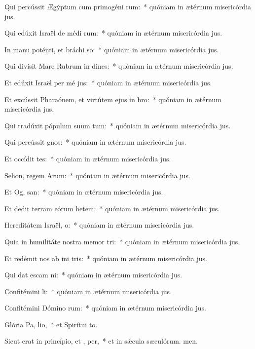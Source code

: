 \item Qui percússit Ægýptum cum primogéni rum:~* quóniam in ætérnum misericórdia jus.
\item Qui edúxit Israël de médi rum:~* quóniam in ætérnum misericórdia jus.
\item In manu poténti, et bráchi so:~* quóniam in ætérnum misericórdia jus.
\item Qui divísit Mare Rubrum in dines:~* quóniam in ætérnum misericórdia jus.
\item Et edúxit Israël per mé jus:~* quóniam in ætérnum misericórdia jus.
\item Et excússit Pharaónem, et virtútem ejus in  bro:~* quóniam in ætérnum misericórdia jus.
\item Qui tradúxit pópulum suum  tum:~* quóniam in ætérnum misericórdia jus.
\item Qui percússit  gnos:~* quóniam in ætérnum misericórdia jus.
\item Et occídit  tes:~* quóniam in ætérnum misericórdia jus.
\item Sehon, regem Arum:~* quóniam in ætérnum misericórdia jus.
\item Et Og,  san:~* quóniam in ætérnum misericórdia jus.
\item Et dedit terram eórum hetem:~* quóniam in ætérnum misericórdia jus.
\item Hereditátem Israël,  o:~* quóniam in ætérnum misericórdia jus.
\item Quia in humilitáte nostra memor  tri:~* quóniam in ætérnum misericórdia jus.
\item Et redémit nos ab ini tris:~* quóniam in ætérnum misericórdia jus.
\item Qui dat escam  ni:~* quóniam in ætérnum misericórdia jus.
\item Confitémini  li:~* quóniam in ætérnum misericórdia jus.
\item Confitémini Dómino rum:~* quóniam in ætérnum misericórdia jus.
\item Glória Pa,  lio,~* et Spirítui to.
\item Sicut erat in princípio, et ,  per,~* et in sǽcula sæculórum. men.
